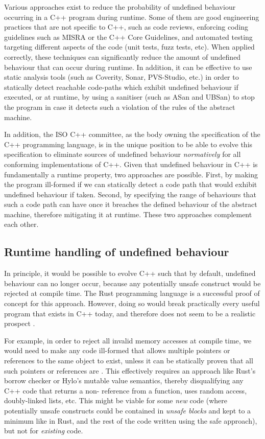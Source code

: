 Various approaches exist to reduce the probability of undefined behaviour occurring in a C++ program during runtime. Some of them are good engineering practices that are not specific to C++, such as code reviews, enforcing coding guidelines such as MISRA or the C++ Core Guidelines, and automated testing targeting different aspects of the code (unit tests, fuzz tests, etc). When applied correctly, these techniques can significantly reduce the amount of undefined behaviour that can occur during runtime. In addition, it can be effective to use static analysis tools (such as Coverity, Sonar, PVS-Studio, etc.) in order to statically detect reachable code-paths which exhibit undefined behaviour if executed, or at runtime, by using a sanitiser (such as ASan and UBSan) to stop the program in case it detects such a violation of the rules of the abstract machine.

In addition, the ISO C++ committee, as the body owning the specification of the C++ programming language, is in the unique position to be able to evolve this specification to eliminate sources of undefined behaviour \emph{normatively} for all conforming implementations of C++. Given that undefined behaviour in C++ is fundamentally a runtime property, two approaches are possible. First, by making the program ill-formed if we can statically detect a code path that would exhibit undefined behaviour if taken. Second, by specifying the range of behaviours that such a code path can have once it breaches the defined behaviour of the abstract machine, therefore mitigating it at runtime. These two approaches complement each other.

\subsection{Runtime handling of undefined behaviour}

In principle, it would be possible to evolve C++ such that by default, undefined behaviour can no longer occur, because any  potentially unsafe construct would be rejected at compile time. The Rust programming language is a successful proof of concept for this approach. However, doing so would break practically every useful program that exists in C++ today, and therefore does not seem to be a realistic prospect \cite{Doumler2023}.

For example, in order to reject all invalid memory accesses at compile time, we would need to make any code ill-formed that allows multiple pointers or references to the same object to exist, unless it can be statically proven that all such pointers or references are . This effectively requires an approach like Rust's borrow checker or Hylo's mutable value semantics, thereby disqualifying any C++ code that returns a non- reference from a function, uses random access, doubly-linked lists, etc. This might be viable for some \emph{new} code (where potentially unsafe constructs could be contained in \emph{unsafe blocks} and kept to a minimum like in Rust, and the rest of the code written using the safe approach), but not for \emph{existing} code. 

